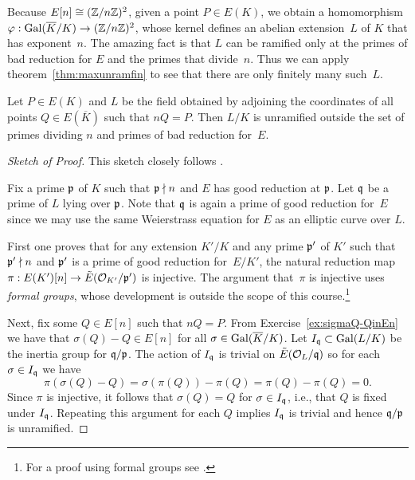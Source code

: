 Because $E[n] \cong (\mathbb{Z}/n\mathbb{Z})^2$, 
given a point $P\in E(K)$, we obtain a homomorphism
$\varphi: \operatorname{Gal}(\overline{K}/K) \to (\mathbb{Z}/n\mathbb{Z})^2$, whose kernel defines an
abelian extension~$L$ of $K$ that has exponent~$n$.
The amazing fact is that $L$ can be ramified only at the primes
of bad reduction for $E$ and the primes that divide~$n$.
Thus we can apply theorem~\ref{thm:maxunramfin} to see that there are
only finitely many such~$L$.

\begin{theorem}\label{thm:mwunram}
  Let $P\in E(K)$ and $L$ be the field obtained by adjoining the
  coordinates of all points $Q \in E(\overline{K})$ such that $nQ = P$.
  Then $L/K$ is unramified outside the set of primes
  dividing $n$ and primes of bad reduction for~$E$.
\end{theorem}
\begin{proof}[Sketch of Proof]
  This sketch closely follows \cite[Prop.~VIII.1.5b]{silverman:aec}.
  
  Fix a prime $\mathfrak{p}$ of $K$ such that $\mathfrak{p} \nmid n$ and $E$ has good
  reduction at $\mathfrak{p}$. Let $\mathfrak{q}$ be a prime of $L$ lying over $\mathfrak{p}$.  
  Note that $\mathfrak{q}$ is again a prime of good reduction for~$E$
  since we may use the same Weierstrass equation for $E$ as an
  elliptic curve over $L$.
  
  First one proves that for any extension $K'/K$ and any prime $\mathfrak{p}'$ of $K'$
  such that $\mathfrak{p}' \nmid n$ and $\mathfrak{p}'$ is a prime of good reduction for~$E/K'$,
  the natural reduction map $\pi: E(K')[n] \to \tilde{E}(\mathcal{O}_{K'}/\mathfrak{p}')$
  is injective. The argument that~$\pi$ is injective uses
  \emph{formal groups}, whose development is outside the
  scope of this course.\footnote{For a proof using formal groups see 
    \cite[Prop.~VII.3.1b]{silverman:aec}.}
  
  Next, fix some $Q \in E[n]$ such that $nQ = P$.
  From Exercise~\ref{ex:sigmaQ-QinEn} we have that $\sigma(Q)-Q\in E[n]$ for
  all $\sigma \in \operatorname{Gal}(\overline{K}/K)$. Let $I_{\mathfrak{q}}\subset \operatorname{Gal}(L/K)$
  be the inertia group for $\mathfrak{q}/\mathfrak{p}$. The action of $I_{\mathfrak{q}}$ is trivial on 
  $\tilde{E}(\mathcal{O}_L/\mathfrak{q})$ so for each $\sigma \in I_{\mathfrak{q}}$ we have
  \[
    \pi(\sigma(Q) - Q) = \sigma(\pi(Q)) - \pi(Q) = \pi(Q) - \pi(Q) = 0.
  \]
  Since $\pi$ is injective, it follows that $\sigma(Q) = Q$ for $\sigma\in I_{\mathfrak{q}}$,
  i.e., that $Q$ is fixed under $I_{\mathfrak{q}}$. Repeating this argument for
  each $Q$ implies $I_{\mathfrak{q}}$ is trivial and hence $\mathfrak{q}/\mathfrak{p}$ is unramified.
\end{proof}

